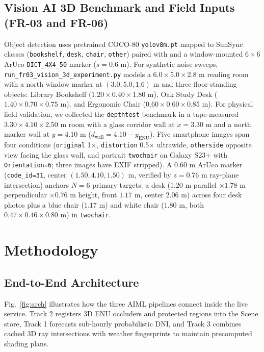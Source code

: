 \documentclass[conference]{IEEEtran}
\begin{document}
\subsection{Vision AI 3D Benchmark and Field Inputs (FR-03 and FR-06)}
Object detection uses pretrained COCO-80 \texttt{yolov8m.pt} \cite{b7} mapped to SunSync classes (\texttt{bookshelf}, \texttt{desk}, \texttt{chair}, \texttt{other}) paired with  \cite{b6} and a window-mounted $6 \times 6$ ArUco \texttt{DICT\_4X4\_50} marker ($s = 0.6\text{ m}$). For synthetic noise sweeps, \texttt{run\_fr03\_vision\_3d\_experiment.py} models a $6.0 \times 5.0 \times 2.8\text{ m}$ reading room with a north window marker at $(3.0, 5.0, 1.6)\text{ m}$ and three floor-standing objects: Library Bookshelf ($1.20 \times 0.40 \times 1.80\text{ m}$), Oak Study Desk ($1.40 \times 0.70 \times 0.75\text{ m}$), and Ergonomic Chair ($0.60 \times 0.60 \times 0.85\text{ m}$). For physical field validation, we collected the \texttt{depthtest} benchmark in a tape-measured $3.30 \times 4.10 \times 2.50\text{ m}$ room with a glass corridor wall at $x = 3.30\text{ m}$ and a north marker wall at $y = 4.10\text{ m}$ ($d_{\mathrm{wall}} = 4.10 - y_{\mathrm{ENU}}$). Five smartphone images span four conditions (\texttt{original} 1$\times$, \texttt{distortion} 0.5$\times$ ultrawide, \texttt{otherside} opposite view facing the glass wall, and portrait \texttt{twochair} on Galaxy S23+ with \texttt{Orientation=6}; three images have EXIF stripped). A $0.60\text{ m}$ ArUco marker (\texttt{code\_id=31}, center $(1.50, 4.10, 1.50)\text{ m}$, verified by $z = 0.76\text{ m}$ ray-plane intersection) anchors $N=6$ primary targets: a desk ($1.20\text{ m}$ parallel $\times 1.78\text{ m}$ perpendicular $\times 0.76\text{ m}$ height, front $1.17\text{ m}$, center $2.06\text{ m}$) across four desk photos plus a blue chair ($1.17\text{ m}$) and white chair ($1.80\text{ m}$, both $0.47 \times 0.46 \times 0.80\text{ m}$) in \texttt{twochair}.

\section{Methodology}

\subsection{End-to-End Architecture}
Fig.~\ref{fig:arch} illustrates how the three AIML pipelines connect inside the live service. Track 2 registers 3D ENU occluders and protected regions into the Scene store, Track 1 forecasts sub-hourly probabilistic DNI, and Track 3 combines cached 3D ray intersections with weather fingerprints to maintain precomputed shading plans.
\end{document}
